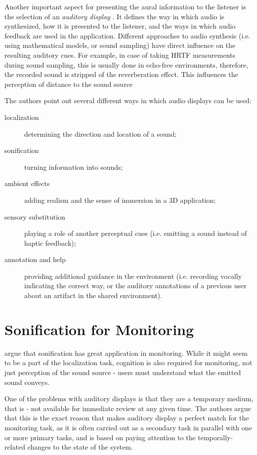 Another important aspect for presenting the aural information to the listener is the selection of an \textit{auditory display} \parencite[p.~153]{jr_3d_2017}. It defines the way in which audio is synthesized, how it is presented to the listener, and the ways in which audio feedback are used in the application.
Different approaches to audio synthesis (i.e. using mathematical models, or sound sampling) have direct influence on the resulting auditory cues. For example, in case of taking HRTF measurements during sound sampling, this is usually done in echo-free environments, therefore, the recorded sound is stripped of the reverberation effect. This influences the perception of distance to the sound source

The authors point out several different ways in which audio displays can be used:
\begin{description}
	\item[localization] determining the direction and location of a sound;
	\item[sonification] turning information into sounds;
	\item[ambient effects] adding realism and the sense of immersion in a 3D application;
	\item[sensory substitution] playing a role of another perceptual cues (i.e. emitting a sound instead of haptic feedback); 
	\item[annotation and help] providing additional guidance in the environment (i.e. recording vocally indicating the correct way, or the auditory annotations of a previous user about an artifact in the shared environment).
\end{description}

\section{Sonification for Monitoring}
\parencite{hermann_sonification_2011} argue that sonification has great application in monitoring. While it might seem to be a part of the localization task, cognition is also required for monitoring, not just perception of the sound source - users must understand what the emitted sound conveys.

One of the problems with auditory displays is that they are a temporary medium, that is - not available for immediate review at any given time. The authors argue that this is the exact reason that makes auditory display a perfect match for the monitoring task, as it is often carried out as a secondary task in parallel with one or more primary tasks, and is based on paying attention to the temporally-related changes to the state of the system.

